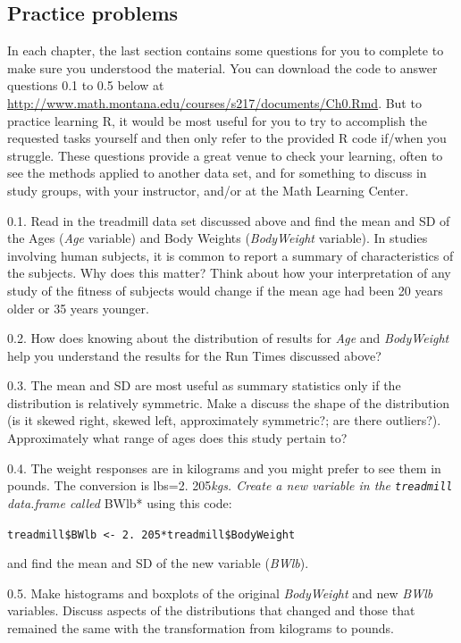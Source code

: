 \documentclass[]{article}
\begin{document}
\subsection{Practice problems}\label{practice-problems}

In each chapter, the last section contains some questions for you to
complete to make sure you understood the material. You can download the
code to answer questions 0.1 to 0.5 below at
\url{http://www.math.montana.edu/courses/s217/documents/Ch0.Rmd}. But to
practice learning R, it would be most useful for you to try to
accomplish the requested tasks yourself and then only refer to the
provided R code if/when you struggle. These questions provide a great
venue to check your learning, often to see the methods applied to
another data set, and for something to discuss in study groups, with
your instructor, and/or at the Math Learning Center.

0.1. Read in the treadmill data set discussed above and find the mean
and SD of the Ages (\emph{Age} variable) and Body Weights
(\emph{BodyWeight} variable). In studies involving human subjects, it is
common to report a summary of characteristics of the subjects. Why does
this matter? Think about how your interpretation of any study of the
fitness of subjects would change if the mean age had been 20 years older
or 35 years younger.

0.2. How does knowing about the distribution of results for \emph{Age}
and \emph{BodyWeight} help you understand the results for the Run Times
discussed above?

0.3. The mean and SD are most useful as summary statistics only if the
distribution is relatively symmetric. Make a discuss the shape of the
distribution (is it skewed right, skewed left, approximately symmetric?;
are there outliers?). Approximately what range of ages does this study
pertain to?

0.4. The weight responses are in kilograms and you might prefer to see
them in pounds. The conversion is lbs=2. 205\emph{kgs. Create a new
variable in the \texttt{treadmill}\\
data.frame called }BWlb* using this code:

\texttt{treadmill\$BWlb\ \textless{}-\ 2.\ 205*treadmill\$BodyWeight}

and find the mean and SD of the new variable (\emph{BWlb}).

0.5. Make histograms and boxplots of the original \emph{BodyWeight} and
new \emph{BWlb} variables. Discuss aspects of the distributions that
changed and those that remained the same with the transformation from
kilograms to pounds.
\end{document}
